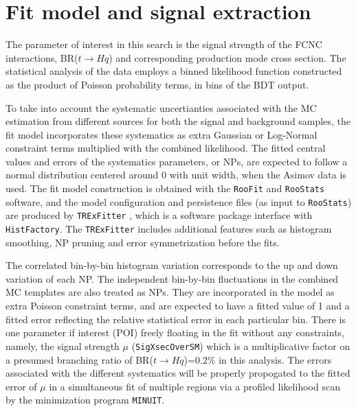 \section{Fit model and signal extraction}
\label{sec:fit}

The parameter of interest in this search is the signal strength of the FCNC interactions, BR($t\to Hq$) and corresponding production mode cross section. The statistical analysis of the data employs a binned likelihood function constructed as the product of Poisson probability terms, in bins of the BDT output.

To take into account the systematic uncertianties associated with the MC estimation from different sources for both the signal and background samples, the fit model incorporates these systematics as extra Gaussian or Log-Normal constraint terms multiplied with the combined likelihood. The fitted central values and errors of the systematics parameters, or NPs, are expected to follow a normal distribution centered around 0 with unit width, when the Asimov data is used. The fit model construction is obtained with the \texttt{RooFit} and \texttt{RooStats} software, and the model configuration and persistence files (as input to \texttt{RooStats}) are produced by \texttt{TRExFitter} \cite{TRExFitter}, which is a software package interface with \texttt{HistFactory}. The \texttt{TRExFitter} includes additional features such as histogram smoothing, NP pruning and error symmetrization before the fits.

The correlated bin-by-bin histogram variation corresponds to the up and down variation of each NP. The independent bin-by-bin fluctuations in the combined MC templates are also treated as NPs. They are incorporated in the model as extra Poisson constraint terms, and are expected to have a fitted value of 1 and a fitted error reflecting the relative statistical error in each particular bin. There is one parameter if interest (POI) freely floating in the fit without any constraints, namely, the signal strength $\mu$ (\texttt{SigXsecOverSM}) which is a multiplicative factor on a presumed branching ratio of BR($t\to Hq$)=$0.2\%$ in this analysis. The errors associated with the different systematics will be properly propogated to the fitted error of $\mu$ in a simultaneous fit of multiple regions via a profiled likelihood scan by the minimization program \texttt{MINUIT}. 

